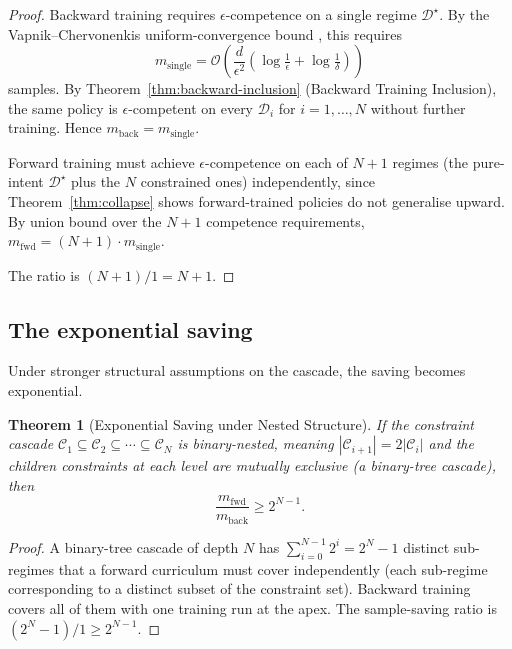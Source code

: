 \documentclass[twocolumn,11pt,a4paper]{article}
\newtheorem{theorem}{Theorem}[section]
\newcommand{\cD}{\mathcal{D}}
\newcommand{\cC}{\mathcal{C}}
\begin{document}
\begin{proof}
Backward training requires $\epsilon$-competence on a single regime $\cD^\star$. By the Vapnik--Chervonenkis uniform-convergence bound \citep{blumer1989learnability,vapnik1998statistical,shalev2014understanding}, this requires
\begin{equation}
m_{\mathrm{single}} = \mathcal{O}\!\left(\frac{d}{\epsilon^2}\left(\log \tfrac{1}{\epsilon} + \log \tfrac{1}{\delta}\right)\right)
\end{equation}
samples. By Theorem~\ref{thm:backward-inclusion} (Backward Training Inclusion), the same policy is $\epsilon$-competent on every $\cD_i$ for $i = 1, \ldots, N$ without further training. Hence $m_{\mathrm{back}} = m_{\mathrm{single}}$.

Forward training must achieve $\epsilon$-competence on each of $N+1$ regimes (the pure-intent $\cD^\star$ plus the $N$ constrained ones) independently, since Theorem~\ref{thm:collapse} shows forward-trained policies do not generalise upward. By union bound over the $N+1$ competence requirements, $m_{\mathrm{fwd}} = (N+1) \cdot m_{\mathrm{single}}$.

The ratio is $(N+1)/1 = N+1$.
\end{proof}

\subsection{The exponential saving}

Under stronger structural assumptions on the cascade, the saving becomes exponential.

\begin{theorem}[Exponential Saving under Nested Structure]
\label{thm:exp-saving}
If the constraint cascade $\cC_1 \subseteq \cC_2 \subseteq \cdots \subseteq \cC_N$ is binary-nested, meaning $|\cC_{i+1}| = 2|\cC_i|$ and the children constraints at each level are mutually exclusive (a binary-tree cascade), then
\begin{equation}
\frac{m_{\mathrm{fwd}}}{m_{\mathrm{back}}} \geq 2^{N-1}.
\end{equation}
\end{theorem}

\begin{proof}
A binary-tree cascade of depth $N$ has $\sum_{i=0}^{N-1} 2^i = 2^N - 1$ distinct sub-regimes that a forward curriculum must cover independently (each sub-regime corresponding to a distinct subset of the constraint set). Backward training covers all of them with one training run at the apex. The sample-saving ratio is $(2^N - 1)/1 \geq 2^{N-1}$.
\end{proof}
\end{document}
